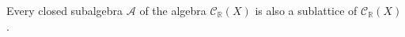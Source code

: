 Every closed subalgebra $\mathcal{A}$ of the algebra $\mathcal{C}_{\mathbb{R}}(X)$ is also a sublattice of $\mathcal{C}_{\mathbb{R}}(X)$.
